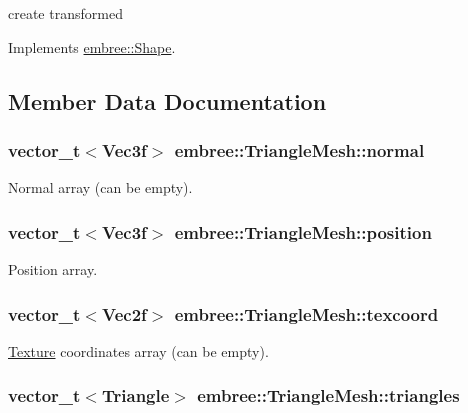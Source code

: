 create transformed 



Implements \hyperlink{classembree_1_1_shape_a33a3df726fed0bf3e6e36da428091305}{embree::Shape}.



\subsection{Member Data Documentation}
\hypertarget{classembree_1_1_triangle_mesh_af313e5aa4a8898c5cf34c3383ad0f1a2}{
\subsubsection[{normal}]{\setlength{\rightskip}{0pt plus 5cm}vector\_\-t$<$Vec3f$>$ {\bf embree::TriangleMesh::normal}}}
\label{classembree_1_1_triangle_mesh_af313e5aa4a8898c5cf34c3383ad0f1a2}


Normal array (can be empty). 

\hypertarget{classembree_1_1_triangle_mesh_a8a02076acbbf919564dd43a729924fa2}{
\subsubsection[{position}]{\setlength{\rightskip}{0pt plus 5cm}vector\_\-t$<$Vec3f$>$ {\bf embree::TriangleMesh::position}}}
\label{classembree_1_1_triangle_mesh_a8a02076acbbf919564dd43a729924fa2}


Position array. 

\hypertarget{classembree_1_1_triangle_mesh_a3d26d3b80193bfb3382ac34c217f1b2d}{
\subsubsection[{texcoord}]{\setlength{\rightskip}{0pt plus 5cm}vector\_\-t$<$Vec2f$>$ {\bf embree::TriangleMesh::texcoord}}}
\label{classembree_1_1_triangle_mesh_a3d26d3b80193bfb3382ac34c217f1b2d}


\hyperlink{classembree_1_1_texture}{Texture} coordinates array (can be empty). 

\hypertarget{classembree_1_1_triangle_mesh_a0687f3b2a9800ef845be1770c94f76f8}{
\subsubsection[{triangles}]{\setlength{\rightskip}{0pt plus 5cm}vector\_\-t$<${\bf Triangle}$>$ {\bf embree::TriangleMesh::triangles}}}
\label{classembree_1_1_triangle_mesh_a0687f3b2a9800ef845be1770c94f76f8}


